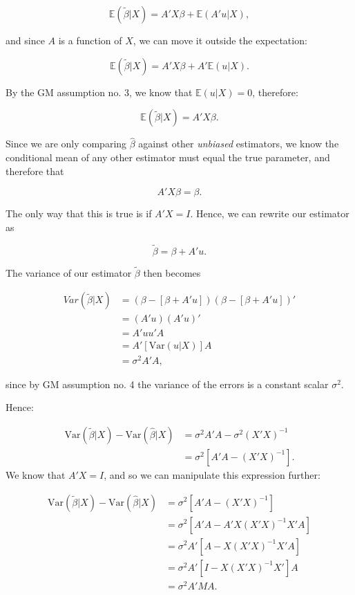 \documentclass[
]{book}
\begin{document}
\[
\mathbb{E}(\tilde{\beta}|X) = A'X\beta + \mathbb{E}(A'u|X),
\]

and since \(A\) is a function of \(X\), we can move it outside the expectation:

\[
\mathbb{E}(\tilde{\beta}|X) = A'X\beta + A'\mathbb{E}(u|X).
\]

By the GM assumption no. 3, we know that \(\mathbb{E}(u|X) = 0\), therefore:

\[
\mathbb{E}(\tilde{\beta}|X) = A'X\beta.
\]

Since we are only comparing \(\hat{\beta}\) against other \emph{unbiased} estimators, we know the conditional mean of any other estimator must equal the true parameter, and therefore that

\[A'X\beta = \beta.\]

The only way that this is true is if \(A'X = I\). Hence, we can rewrite our estimator as

\[
\tilde{\beta} = \beta + A'u.
\]

The variance of our estimator \(\tilde{\beta}\) then becomes

\[
\begin{aligned}
Var(\tilde{\beta}|X) &= (\beta - [\beta +  A'u])(\beta - [\beta +  A'u])' \\
&= (A'u)(A'u)' \\
&= A'uu'A \\
&= A'[\text{Var}(u|X)]A \\
&= \sigma^2A'A,
\end{aligned}
\]

since by GM assumption no. 4 the variance of the errors is a constant scalar \(\sigma^2\).

Hence:

\[
\begin{aligned}
\text{Var}(\tilde{\beta}|X) - \text{Var}(\hat{\beta}|X) &= \sigma^2A'A - \sigma^2(X'X)^{-1} \\
&= \sigma^2[A'A - (X'X)^{-1}].
\end{aligned}
\]
We know that \(A'X = I\), and so we can manipulate this expression further:

\[
\begin{aligned}
\text{Var}(\tilde{\beta}|X) - \text{Var}(\hat{\beta}|X)
&= \sigma^2[A'A - (X'X)^{-1}] \\
&= \sigma^2[A'A - A'X(X'X)^{-1}X'A]\\
&=\sigma^2A'[A-X(X'X)^{-1}X'A] \\
&= \sigma^2A'[I-X(X'X)^{-1}X']A\\
& = \sigma^2A'MA.
\end{aligned}
\]
\end{document}
